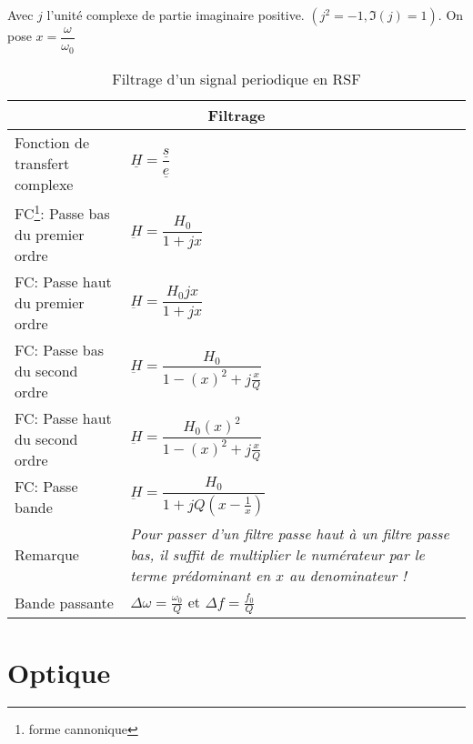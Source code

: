 \documentclass[10pt,a4paper,titlepage,landscape]{article}
\renewcommand{\arraystretch}{2}
\begin{document}
\begin{table}[H]
    \centering
    Avec $j$ l'unité complexe de partie imaginaire positive. $\left(j^2 = -1, \Im(j)=1\right)$. On pose $x = \dfrac{\omega}{\omega_0}$
    \renewcommand{\arraystretch}{1.5} %
    \setlength{\tabcolsep}{8pt} %
    \begin{tabular}{@{}|p{9cm}|p{10cm}@{}|}

        \multicolumn{2}{c}{\textbf{Filtrage}} \\ \hline

        Fonction de transfert complexe & $\underline{H} = \dfrac{\underline{s}}{\underline{e}}$ \\ \hline
        FC\footnote{forme cannonique}: Passe bas du premier ordre & $\underbar{H} = \dfrac{H_0}{1+jx}$ \\ \hline
        FC: Passe haut du premier ordre & $\underbar{H} = \dfrac{H_0jx}{1+jx}$ \\ \hline 
        FC: Passe bas du second ordre & $\underbar{H} = \dfrac{H_0}{1-\left(x\right)^2 + j\frac{x}{Q}}$ \\ \hline
        FC: Passe haut du second ordre & $\underbar{H} = \dfrac{H_0\left(x\right)^2}{1-\left(x\right)^2 + j\frac{x}{Q}}$ \\ \hline
        FC: Passe bande & $\underbar{H} = \dfrac{H_0}{1+jQ\left(x-\frac{1}{x}\right)}$ \\ \hline 
        Remarque & \textit{Pour passer d'un filtre passe haut à un filtre passe bas, il suffit de multiplier le numérateur par le terme prédominant en $x$ au denominateur !} \\ \hline 
        Bande passante & $\Delta\omega = \frac{\omega_0}{Q}$ et $\Delta f=\frac{f_0}{Q}$\\ \hline
    \end{tabular}
\caption{Filtrage d'un signal periodique en RSF}
\label{tab:filtrage}
\end{table}



\section{Optique}
\end{document}
